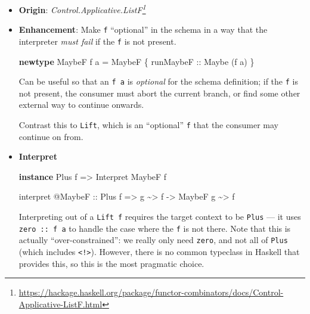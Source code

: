 \documentclass[]{article}
\newenvironment{Shaded}{}{}
\newcommand{\DataTypeTok}[1]{\textcolor[rgb]{0.56,0.13,0.00}{#1}}
\newcommand{\KeywordTok}[1]{\textcolor[rgb]{0.00,0.44,0.13}{\textbf{#1}}}
\newcommand{\NormalTok}[1]{#1}
\newcommand{\OperatorTok}[1]{\textcolor[rgb]{0.40,0.40,0.40}{#1}}
\newcommand{\OtherTok}[1]{\textcolor[rgb]{0.00,0.44,0.13}{#1}}
\renewcommand{\href}[2]{#2\footnote{\url{#1}}}
\begin{document}
\begin{itemize}
\item
  \textbf{Origin}:
  \emph{\href{https://hackage.haskell.org/package/functor-combinators/docs/Control-Applicative-ListF.html}{Control.Applicative.ListF}}
\item
  \textbf{Enhancement}: Make \texttt{f} ``optional'' in the schema in a way that
  the interpreter \emph{must fail} if the \texttt{f} is not present.

\begin{Shaded}
\begin{Highlighting}[]
\KeywordTok{newtype} \DataTypeTok{MaybeF}\NormalTok{ f a }\OtherTok{=} \DataTypeTok{MaybeF}\NormalTok{ \{}\OtherTok{ runMaybeF ::} \DataTypeTok{Maybe}\NormalTok{ (f a) \}}
\end{Highlighting}
\end{Shaded}

  Can be useful so that an \texttt{f\ a} is \emph{optional} for the schema
  definition; if the \texttt{f} is not present, the consumer must abort the
  current branch, or find some other external way to continue onwards.

  Contrast this to \texttt{Lift}, which is an ``optional'' \texttt{f} that the
  consumer may continue on from.
\item
  \textbf{Interpret}

\begin{Shaded}
\begin{Highlighting}[]
\KeywordTok{instance} \DataTypeTok{Plus}\NormalTok{ f }\OtherTok{=\textgreater{}} \DataTypeTok{Interpret} \DataTypeTok{MaybeF}\NormalTok{ f}

\NormalTok{interpret }\OperatorTok{@}\DataTypeTok{MaybeF}
\OtherTok{    ::} \DataTypeTok{Plus}\NormalTok{ f}
    \OtherTok{=\textgreater{}}\NormalTok{ g }\OperatorTok{\textasciitilde{}\textgreater{}}\NormalTok{ f}
    \OtherTok{{-}\textgreater{}} \DataTypeTok{MaybeF}\NormalTok{ g }\OperatorTok{\textasciitilde{}\textgreater{}}\NormalTok{ f}
\end{Highlighting}
\end{Shaded}

  Interpreting out of a \texttt{Lift\ f} requires the target context to be
  \texttt{Plus} --- it uses \texttt{zero\ ::\ f\ a} to handle the case where the
  \texttt{f} is not there. Note that this is actually ``over-constrained'': we
  really only need \texttt{zero}, and not all of \texttt{Plus} (which includes
  \texttt{\textless{}!\textgreater{}}). However, there is no common typeclass in
  Haskell that provides this, so this is the most pragmatic choice.
\end{itemize}
\end{document}
